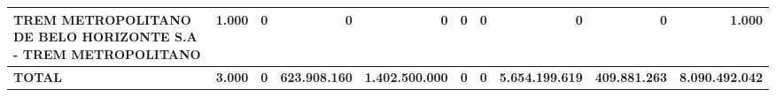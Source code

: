 \documentclass{article}
\begin{document}
\begin{landscape}
\begin{longtable}[c]{m{5.0cm}|m{1.75cm}|m{1.75cm}|m{1.75cm}|m{1.75cm}|m{1.75cm}|m{1.75cm}|m{1.75cm}|m{1.75cm}|m{1.0cm}}
\multicolumn{1}{L{5cm}|}{TREM METROPOLITANO DE BELO HORIZONTE S.A - TREM METROPOLITANO} & \multicolumn{1}{r|}{1.000} & \multicolumn{1}{r|}{0} & \multicolumn{1}{r|}{          0} & \multicolumn{1}{r|}{            0} & \multicolumn{1}{r|}{0} & \multicolumn{1}{r|}{0} & \multicolumn{1}{r|}{            0} & \multicolumn{1}{r|}{          0} & \multicolumn{1}{r}{ \textbf{1.000}} \\
\hline \hline
\multicolumn{1}{L{5cm}|}{ \textbf{TOTAL}} & \multicolumn{1}{r|}{ \textbf{3.000}} & \multicolumn{1}{r|}{ \textbf{0}} & \multicolumn{1}{r|}{ \textbf{623.908.160}} & \multicolumn{1}{r|}{ \textbf{1.402.500.000}} & \multicolumn{1}{r|}{ \textbf{0}} & \multicolumn{1}{r|}{ \textbf{0}} & \multicolumn{1}{r|}{ \textbf{5.654.199.619}} & \multicolumn{1}{r|}{ \textbf{409.881.263}} & \multicolumn{1}{r}{ \textbf{8.090.492.042}} \\\end{longtable}\end{landscape}
\end{document}
